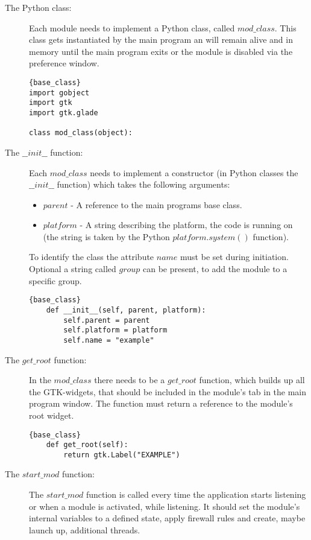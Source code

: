 \documentclass[a4paper, 11pt]{article}
\begin{document}
            \begin{description}
                \item[The Python class:] Each module needs to implement a Python class, called $mod\_class$. This class gets instantiated by the main program an will remain alive and in memory until the main program exits or the module is disabled via the preference window.

                \begin{lstlisting}[caption=Python class]{base_class}
import gobject
import gtk
import gtk.glade

class mod_class(object):
                \end{lstlisting}
                
                \item[The $\_\_init\_\_$ function:] Each $mod\_class$ needs to implement a constructor (in Python classes the $\_\_init\_\_$ function) which takes the following arguments:
                    \begin{itemize}
                        \item $parent$ - A reference to the main programs base class.
                        \item $platform$ - A string describing the platform, the code is running on (the string is taken by the Python $platform.system()$ function).
                    \end{itemize}
                To identify the class the attribute $name$ must be set during initiation. Optional a string called $group$ can be present, to add the module to a specific group.

                \begin{lstlisting}[caption=Constructor]{base_class}
    def __init__(self, parent, platform):
        self.parent = parent
        self.platform = platform
        self.name = "example"   
                \end{lstlisting}
                             
                \item[The $get\_root$ function:] In the $mod\_class$ there needs to be a $get\_root$ function, which builds up all the GTK-widgets, that should be included in the module's tab in the main program window. The function must return a reference to the module's root widget.
                
                \begin{lstlisting}[caption=The GTK part]{base_class}
    def get_root(self):
        return gtk.Label("EXAMPLE")
                \end{lstlisting}
                \item[The $start\_mod$ function:] The $start\_mod$ function is called every time the application starts listening or when a module is activated, while listening. It should set the module's internal variables to a defined state, apply firewall rules and create, maybe launch up, additional threads.


\end{description}
\end{document}
